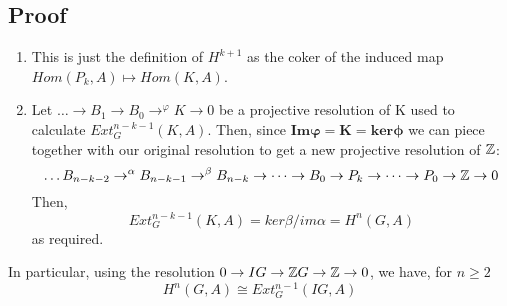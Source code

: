 \subsection*{Proof}
\begin{enumerate}
    \item This is just the definition of $H^{k+1}$ as the coker of
    the induced map $Hom(P_k,A)\mapsto Hom(K,A)$.
    \item Let $\dots \rightarrow B_1 \rightarrow B_0
    \rightarrow^\varphi K\rightarrow 0$ be a projective resolution
    of K used to calculate $Ext_G^{n-k-1}(K,A)$. Then, since $\mathbf{Im \varphi = K = ker \phi}$ we can piece
    together with our original resolution to get a new projective
    resolution of $\mathbb Z$:
    $$\dots B_{n-k-2}\rightarrow^\alpha B_{n-k-1}\rightarrow^\beta
    B_{n-k} \rightarrow \dots \rightarrow B_0\rightarrow
    P_k\rightarrow \dots \rightarrow P_0 \rightarrow \mathbb Z\rightarrow
    0$$
    Then,
    $$Ext_G^{n-k-1}(K,A) = {ker\beta}/{im\alpha} = H^n(G,A)$$ as
    required.
\end{enumerate}
In particular, using the resolution $0\rightarrow IG\rightarrow \mathbb Z
G\rightarrow \mathbb Z\rightarrow 0$, we have, for $n\geq2$
$$H^n(G,A) \cong Ext_G^{n-1} (IG,A)$$


